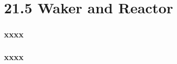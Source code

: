 \section{21.5 Waker and Reactor} %
\begin{frame}[fragile]
    \frametitle{xxxx}
\end{frame}
% 
% 
% 
% 
% 
% 
\begin{frame}[fragile]
    \frametitle{xxxx}
\end{frame}
% 
% 
% 
% 
% 
% 
